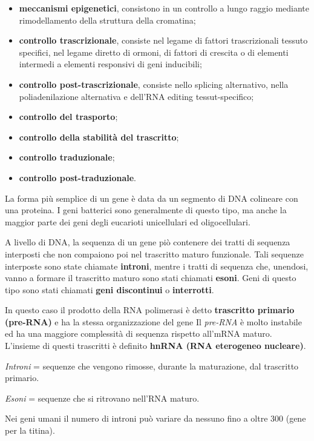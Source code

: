 \documentclass[11pt]{book}
\begin{document}
\begin{itemize}
\itemsep1pt\parskip0pt
\item
  \textbf{meccanismi epigenetici}, consistono in un controllo a lungo
  raggio mediante rimodellamento della struttura della cromatina;
\item
  \textbf{controllo trascrizionale}, consiste nel legame di fattori
  trascrizionali tessuto specifici, nel legame diretto di ormoni, di
  fattori di crescita o di elementi intermedi a elementi responsivi di
  geni inducibili;
\item
  \textbf{controllo post-trascrizionale}, consiste nello splicing
  alternativo, nella poliadenilazione alternativa e dell'RNA editing
  tessut-specifico;
\item
  \textbf{controllo del trasporto};
\item
  \textbf{controllo della stabilità del trascritto};
\item
  \textbf{controllo traduzionale};
\item
  \textbf{controllo post-traduzionale}.
\end{itemize}

La forma più semplice di un gene è data da un segmento di DNA colineare
con una proteina. I geni batterici sono generalmente di questo tipo, ma
anche la maggior parte dei geni degli eucarioti unicellulari ed
oligocellulari.

A livello di DNA, la sequenza di un gene piò contenere dei tratti di
sequenza interposti che non compaiono poi nel trascritto maturo
funzionale. Tali sequenze interposte sono state chiamate
\textbf{introni}, mentre i tratti di sequenza che, unendosi, vanno a
formare il trascritto maturo sono stati chiamati \textbf{esoni}. Geni di
questo tipo sono stati chiamati \textbf{geni discontinui} o
\textbf{interrotti}.

In questo caso il prodotto della RNA polimerasi è detto
\textbf{trascritto primario (pre-RNA)} e ha la stessa organizzazione del
gene Il \emph{pre-RNA} è molto instabile ed ha una maggiore complessità
di sequenza rispetto all'mRNA maturo. L'insieme di questi trascritti è
definito \textbf{hnRNA (RNA eterogeneo nucleare)}.

\emph{Introni} = sequenze che vengono rimosse, durante la maturazione,
dal trascritto primario.

\emph{Esoni} = sequenze che si ritrovano nell'RNA maturo.

Nei geni umani il numero di introni può variare da nessuno fino a oltre
300 (gene per la titina).
\end{document}
